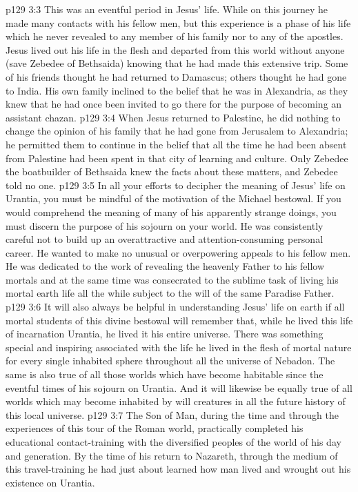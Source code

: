 \vs p129 3:3 This was an eventful period in Jesus’ life. While on this journey he made many contacts with his fellow men, but this experience is a phase of his life which he never revealed to any member of his family nor to any of the apostles. Jesus lived out his life in the flesh and departed from this world without anyone (save Zebedee of Bethsaida) knowing that he had made this extensive trip. Some of his friends thought he had returned to Damascus; others thought he had gone to India. His own family inclined to the belief that he was in Alexandria, as they knew that he had once been invited to go there for the purpose of becoming an assistant chazan.
\vs p129 3:4 When Jesus returned to Palestine, he did nothing to change the opinion of his family that he had gone from Jerusalem to Alexandria; he permitted them to continue in the belief that all the time he had been absent from Palestine had been spent in that city of learning and culture. Only Zebedee the boatbuilder of Bethsaida knew the facts about these matters, and Zebedee told no one.
\vs p129 3:5 \pc In all your efforts to decipher the meaning of Jesus’ life on Urantia, you must be mindful of the motivation of the Michael bestowal. If you would comprehend the meaning of many of his apparently strange doings, you must discern the purpose of his sojourn on your world. He was consistently careful not to build up an overattractive and attention\hyp{}consuming personal career. He wanted to make no unusual or overpowering appeals to his fellow men. He was dedicated to the work of revealing the heavenly Father to his fellow mortals and at the same time was consecrated to the sublime task of living his mortal earth life all the while subject to the will of the same Paradise Father.
\vs p129 3:6 \pc It will also always be helpful in understanding Jesus’ life on earth if all mortal students of this divine bestowal will remember that, while he lived this life of incarnation  Urantia, he lived it  his entire universe. There was something special and inspiring associated with the life he lived in the flesh of mortal nature for every single inhabited sphere throughout all the universe of Nebadon. The same is also true of all those worlds which have become habitable since the eventful times of his sojourn on Urantia. And it will likewise be equally true of all worlds which may become inhabited by will creatures in all the future history of this local universe.
\vs p129 3:7 \pc The Son of Man, during the time and through the experiences of this tour of the Roman world, practically completed his educational contact\hyp{}training with the diversified peoples of the world of his day and generation. By the time of his return to Nazareth, through the medium of this travel\hyp{}training he had just about learned how man lived and wrought out his existence on Urantia.
